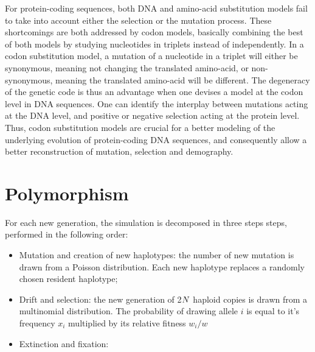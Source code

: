 For protein-coding sequences, both DNA and amino-acid substitution models fail to take into account either the selection or the mutation process.
These shortcomings are both addressed by codon models, basically combining the best of both models by studying nucleotides in triplets instead of independently.
In a codon substitution model, a mutation of a nucleotide in a triplet will either be synonymous, meaning not changing the translated amino-acid, or non-synonymous, meaning the translated amino-acid will be different.
The degeneracy of the genetic code is thus an advantage when one devises a model at the codon level in DNA sequences.
One can identify the interplay between mutations acting at the DNA level, and positive or negative selection acting at the protein level.
Thus, codon substitution models are crucial for a better modeling of the underlying evolution of protein-coding DNA sequences, and consequently allow a better reconstruction of mutation, selection and demography.

\section{Polymorphism}
For each new generation, the simulation is decomposed in three steps
steps, performed in the following order:

\begin{itemize}
	\setlength\itemsep{-0.25em}
	\item  Mutation and creation of new haplotypes: the number of new mutation is drawn from a
	Poisson distribution. Each new haplotype replaces a randomly chosen resident
	haplotype;
	\item Drift and selection: the new generation of 2$N$ haploid copies is drawn from a multinomial
	distribution. The probability of drawing allele $i$ is equal to it's frequency $x_i$ multiplied by
	its relative fitness $w_i / w$
	\item Extinction and fixation: 
\end{itemize}

